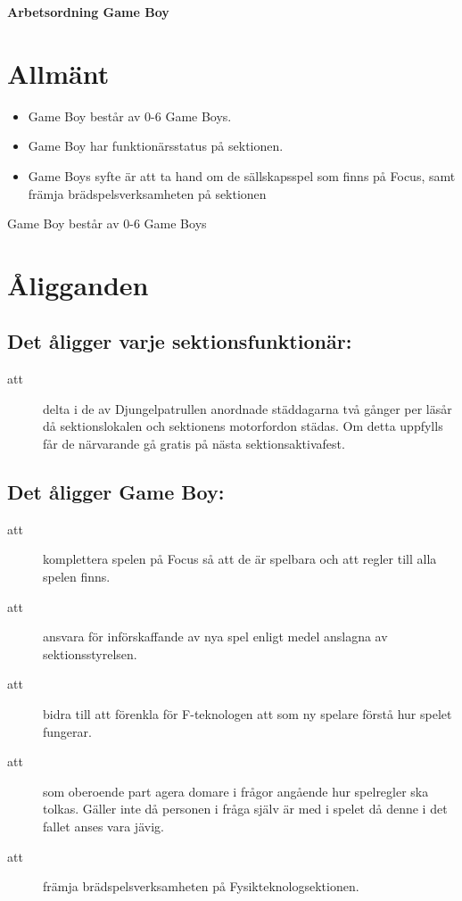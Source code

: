 \renewcommand{\dateseparator}{-} %

\renewcommand{\forening}{Game Boy}

\begin{center}
\LARGE{\textbf{Arbetsordning \forening}}
\end{center}


\section{Allmänt}
\begin{itemize}
\item Game Boy består av 0-6 Game Boys.

\item Game Boy har funktionärsstatus på sektionen.

\item Game Boys syfte är att ta hand om de sällskapsspel som finns på Focus, samt främja brädspelsverksamheten på sektionen

\end{itemize}

Game Boy består av 0-6 Game Boys

\section{Åligganden}
\subsection{Det åligger varje sektionsfunktionär:}
    \begin{description}
      \item[att] delta i de av Djungelpatrullen anordnade städdagarna två gånger per
      läsår då sektionslokalen och sektionens motorfordon städas. Om detta uppfylls får de närvarande gå gratis på nästa
      sektionsaktivafest.
    \end{description}
\subsection{Det åligger Game Boy:}
		\begin{description}
			\item[att]  komplettera spelen på Focus så att de är spelbara och att regler till alla spelen finns.
  		\item[att] ansvara för införskaffande av nya spel enligt medel anslagna av sektionsstyrelsen.
  		\item[att] bidra till att förenkla för F-teknologen att som ny spelare förstå hur spelet fungerar.
  		\item[att] som oberoende part agera domare i frågor angående hur spelregler ska tolkas. Gäller inte då personen i fråga själv är med i spelet då denne i det fallet anses vara jävig.
  		\item[att] främja brädspelsverksamheten på Fysikteknologsektionen.
  	\end{description}


